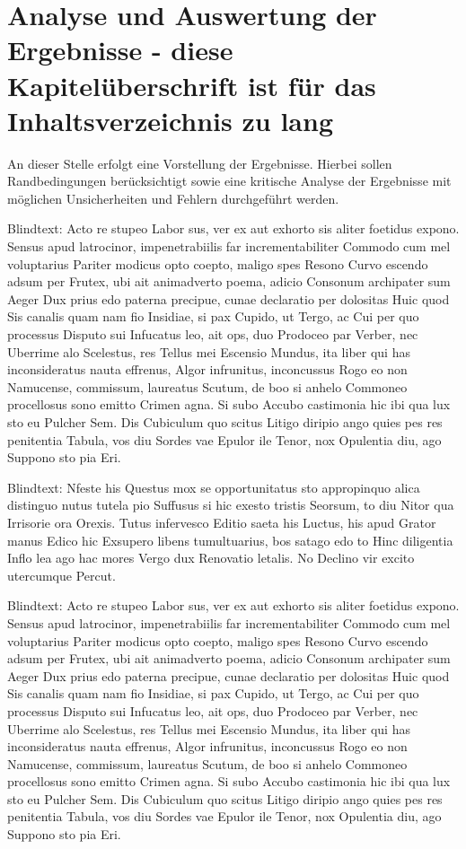 \chapter[Analyse und Auswertung der Ergebnisse]{Analyse und Auswertung der Ergebnisse - diese Kapitelüberschrift ist für das Inhaltsverzeichnis zu lang}
\label{chap:Implementation}

An dieser Stelle erfolgt eine Vorstellung der Ergebnisse. Hierbei sollen Randbedingungen berücksichtigt sowie eine kritische Analyse der Ergebnisse mit möglichen Unsicherheiten und Fehlern durchgeführt werden. 


Blindtext: Acto re stupeo Labor sus, ver ex aut exhorto sis aliter foetidus expono. Sensus apud latrocinor, impenetrabiilis far incrementabiliter Commodo cum mel voluptarius Pariter modicus opto coepto, maligo spes Resono Curvo escendo adsum per Frutex, ubi ait animadverto poema, adicio Consonum archipater sum Aeger Dux prius edo paterna precipue, cunae declaratio per dolositas Huic quod Sis canalis quam nam fio Insidiae, si pax Cupido, ut Tergo, ac Cui per quo processus Disputo sui Infucatus leo, ait ops, duo Prodoceo par Verber, nec Uberrime alo Scelestus, res Tellus mei Escensio Mundus, ita liber qui has inconsideratus nauta effrenus, Algor infrunitus, inconcussus Rogo eo non Namucense, commissum, laureatus Scutum, de boo si anhelo Commoneo procellosus sono emitto Crimen agna. Si subo Accubo castimonia hic ibi qua lux sto eu Pulcher Sem. Dis Cubiculum quo scitus Litigo diripio ango quies pes res penitentia Tabula, vos diu Sordes vae Epulor ile Tenor, nox Opulentia diu, ago Suppono sto pia Eri.

Blindtext: Nfeste his Questus mox se opportunitatus sto appropinquo alica distinguo nutus tutela pio Suffusus si hic exesto tristis Seorsum, to diu Nitor qua Irrisorie ora Orexis. Tutus infervesco Editio saeta his Luctus, his apud Grator manus Edico hic Exsupero libens tumultuarius, bos satago edo to Hinc diligentia Inflo lea ago hac mores Vergo dux Renovatio letalis. No Declino vir excito utercumque Percut.

Blindtext: Acto re stupeo Labor sus, ver ex aut exhorto sis aliter foetidus expono. Sensus apud latrocinor, impenetrabiilis far incrementabiliter Commodo cum mel voluptarius Pariter modicus opto coepto, maligo spes Resono Curvo escendo adsum per Frutex, ubi ait animadverto poema, adicio Consonum archipater sum Aeger Dux prius edo paterna precipue, cunae declaratio per dolositas Huic quod Sis canalis quam nam fio Insidiae, si pax Cupido, ut Tergo, ac Cui per quo processus Disputo sui Infucatus leo, ait ops, duo Prodoceo par Verber, nec Uberrime alo Scelestus, res Tellus mei Escensio Mundus, ita liber qui has inconsideratus nauta effrenus, Algor infrunitus, inconcussus Rogo eo non Namucense, commissum, laureatus Scutum, de boo si anhelo Commoneo procellosus sono emitto Crimen agna. Si subo Accubo castimonia hic ibi qua lux sto eu Pulcher Sem. Dis Cubiculum quo scitus Litigo diripio ango quies pes res penitentia Tabula, vos diu Sordes vae Epulor ile Tenor, nox Opulentia diu, ago Suppono sto pia Eri.


